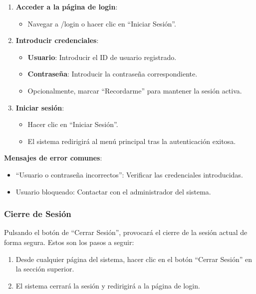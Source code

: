 \begin{enumerate}
   \item \textbf{Acceder a la página de login}:

   \begin{itemize}
      \item Navegar a /login o hacer clic en ``Iniciar Sesión''.
   \end{itemize}
   \item \textbf{Introducir credenciales}:
   \begin{itemize}
      \item \textbf{Usuario}: Introducir el ID de usuario registrado.
      \item \textbf{Contraseña}: Introducir la contraseña correspondiente.
      \item Opcionalmente, marcar ``Recordarme'' para mantener la sesión activa.
   \end{itemize}
   \item \textbf{Iniciar sesión}:
   \begin{itemize}
      \item Hacer clic en ``Iniciar Sesión''.
      \item El sistema redirigirá al menú principal tras la autenticación exitosa.
   \end{itemize}
\end{enumerate}

\textbf{Mensajes de error comunes}:
\begin{itemize}
   \item ``Usuario o contraseña incorrectos'': Verificar las credenciales introducidas.
   \item Usuario bloqueado: Contactar con el administrador del sistema.
\end{itemize}

\subsubsection{Cierre de Sesión}
Pulsando el botón de ``Cerrar Sesión'', provocará el cierre de la sesión actual de forma segura. Estos son los pasos a seguir:

\begin{enumerate}
   \item Desde cualquier página del sistema, hacer clic en el botón ``Cerrar Sesión'' en la sección superior.
   \item El sistema cerrará la sesión y redirigirá a la página de login.
\end{enumerate}

